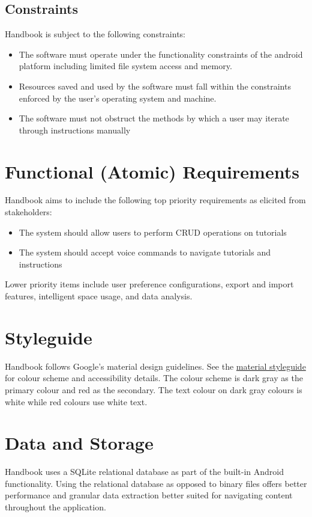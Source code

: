 \documentclass[12pt]{article}
\begin{document}
\subsection{Constraints}

Handbook is subject to the following constraints:

\begin{itemize}

\item The software must operate under the functionality constraints of the android platform including limited file system access and memory.
\item Resources saved and used by the software must fall within the constraints enforced by the user's operating system and machine.
\item The software must not obstruct the methods by which a user may iterate through instructions manually

\end{itemize}

\section{Functional (Atomic) Requirements}

Handbook aims to include the following top priority requirements as elicited from stakeholders:

\begin{itemize}[noitemsep]
\item The system should allow users to perform CRUD operations on tutorials
\item The system should accept voice commands to navigate tutorials and instructions
\end{itemize}

Lower priority items include user preference configurations, export and import features, intelligent space usage, and data analysis.

\section{Styleguide}

Handbook follows Google's material design guidelines. See the \href{https://material.io/color/#!/?view.left=1&view.right=1&primary.color=363b41&secondary.color=ad555a}{material styleguide} for colour scheme and accessibility details. The colour scheme is dark gray as the primary colour and red as the secondary. 
The text colour on dark gray colours is white while red colours use white text. 

\section{Data and Storage}

Handbook uses a SQLite relational database as part of the built-in Android functionality. Using the relational database as opposed to binary files offers better performance and granular data extraction better suited for navigating content throughout the application.
\end{document}
